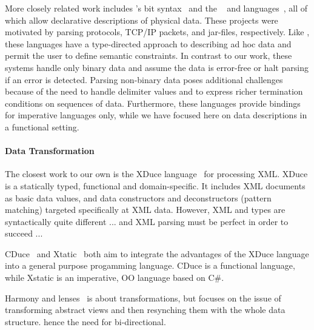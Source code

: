 More closely related work includes \erlang{}'s bit
syntax~\cite{erlang} and the \packettypes{}~\cite{sigcomm00} and
\datascript{} languages~\cite{gpce02}, all of which allow declarative
descriptions of physical data.  These projects were motivated by
parsing protocols, \textsc{TCP/IP} packets, and \java{} jar-files,
respectively.  Like \datatype{}, these languages have a type-directed
approach to describing ad hoc data and permit the user to define
semantic constraints.  In contrast to our work, these systems handle
only binary data and assume the data is error-free or halt parsing if
an error is detected.  Parsing non-binary data poses additional
challenges because of the need to handle delimiter values and to
express richer termination conditions on sequences of
data. Furthermore, these languages provide bindings for imperative
languages only, while we have focused here on data descriptions in a
functional setting.


\paragraph{Data Transformation}

The closest work to our own is the XDuce
language~\cite{hosoya+:xduce-journal} for processing {XML}. XDuce is a
statically typed, functional and domain-specific. It includes {XML}
documents as basic data values, and data constructors and
deconstructors (pattern matching) targeted specifically at {XML}
data. However, {XML} and \datatype{} types are syntactically quite
different ... and {XML} parsing must be perfect in order to succeed ...
 
CDuce~\cite{benzaken+:cduce} and Xtatic~\cite{gapeyev+:XtaticRuntime}
both aim to integrate the advantages of the XDuce language into a
general purpose progamming language. CDuce is a functional language,
while Xstatic is an imperative, OO language based on C\#.

Harmony and lenses~\cite{foster+:lenses} is about transformations, but
focuses on the issue of transforming abstract views and then
resynching them with the whole data structure. hence the need for
bi-directional.




